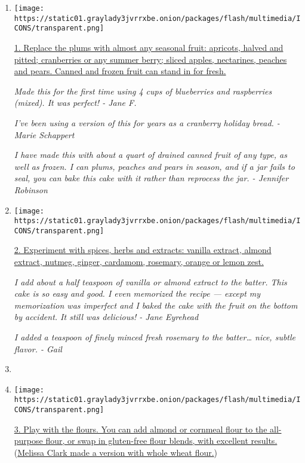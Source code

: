 \begin{enumerate}
\def\labelenumi{\arabic{enumi}.}
\item
  \texttt{[image: https://static01.graylady3jvrrxbe.onion/packages/flash/multimedia/ICONS/transparent.png]}

  \href{http://www.nytimes3xbfgragh.onion/2016/09/14/dining/marian-burros-plum-torte-recipe.html}{1.
  Replace the plums with almost any seasonal fruit: apricots, halved and
  pitted; cranberries or any summer berry; sliced apples, nectarines,
  peaches and pears. Canned and frozen fruit can stand in for fresh.}

  \emph{Made this for the first time using 4 cups of blueberries and
  raspberries (mixed). It was perfect! - Jane F.}

  \emph{I've been using a version of this for years as a cranberry
  holiday bread. - Marie Schappert}

  \emph{I have made this with about a quart of drained canned fruit of
  any type, as well as frozen. I can plums, peaches and pears in season,
  and if a jar fails to seal, you can bake this cake with it rather than
  reprocess the jar. - Jennifer Robinson}
\item
  \texttt{[image: https://static01.graylady3jvrrxbe.onion/packages/flash/multimedia/ICONS/transparent.png]}

  \href{http://www.nytimes3xbfgragh.onion/2016/09/14/dining/marian-burros-plum-torte-recipe.html}{2.
  Experiment with spices, herbs and extracts: vanilla extract, almond
  extract, nutmeg, ginger, cardamom, rosemary, orange or lemon zest.}

  \emph{I add about a half teaspoon of vanilla or almond extract to the
  batter. This cake is so easy and good. I even memorized the recipe ---
  except my memorization was imperfect and I baked the cake with the
  fruit on the bottom by accident. It still was delicious! - Jane
  Eyrehead}

  \emph{I added a teaspoon of finely minced fresh rosemary to the
  batter\ldots{} nice, subtle flavor. - Gail}
\item
\item
  \texttt{[image: https://static01.graylady3jvrrxbe.onion/packages/flash/multimedia/ICONS/transparent.png]}

  \href{http://www.nytimes3xbfgragh.onion/2016/09/14/dining/marian-burros-plum-torte-recipe.html}{3.
  Play with the flours. You can add almond or cornmeal flour to the
  all-purpose flour, or swap in gluten-free flour blends, with excellent
  results.}(\href{http://cooking.nytimes3xbfgragh.onion/recipes/1015810-crunchy-topped-whole-wheat-plum-cake}{Melissa
  Clark made a version with whole wheat flour.})


\end{enumerate}
